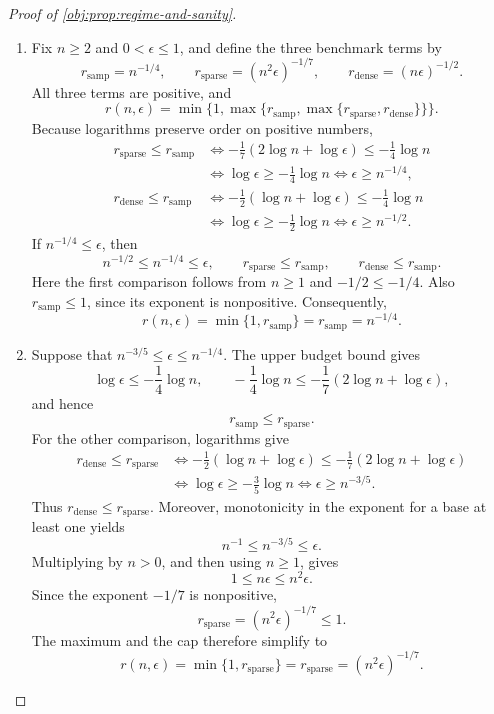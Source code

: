 \documentclass[11pt]{article}
\begin{document}
\begin{proof}[Proof of \cref{obj:prop:regime-and-sanity}]
\begin{enumerate}
\item Fix \(n\ge2\) and \(0<\epsilon\le1\), and define the three benchmark terms by
\[
r_{\mathrm{samp}}=n^{-1/4},
\qquad
r_{\mathrm{sparse}}=(n^2\epsilon)^{-1/7},
\qquad
r_{\mathrm{dense}}=(n\epsilon)^{-1/2}.
\]
All three terms are positive, and
\[
r(n,\epsilon)
=\min\{1,\max\{r_{\mathrm{samp}},
                    \max\{r_{\mathrm{sparse}},r_{\mathrm{dense}}\}\}\}.
\]
Because logarithms preserve order on positive numbers,
\[
\begin{aligned}
r_{\mathrm{sparse}}\le r_{\mathrm{samp}}
&\iff
-\frac17(2\log n+\log\epsilon)\le-\frac14\log n\\
&\iff \log\epsilon\ge-\frac14\log n
\iff \epsilon\ge n^{-1/4},
\\
r_{\mathrm{dense}}\le r_{\mathrm{samp}}
&\iff
-\frac12(\log n+\log\epsilon)\le-\frac14\log n\\
&\iff \log\epsilon\ge-\frac12\log n
\iff \epsilon\ge n^{-1/2}.
\end{aligned}
\]
If \(n^{-1/4}\le\epsilon\), then
\[
n^{-1/2}\le n^{-1/4}\le\epsilon,
\qquad
r_{\mathrm{sparse}}\le r_{\mathrm{samp}},
\qquad
r_{\mathrm{dense}}\le r_{\mathrm{samp}}.
\]
Here the first comparison follows from \(n\ge1\) and
\(-1/2\le-1/4\). Also \(r_{\mathrm{samp}}\le1\), since its exponent is nonpositive. Consequently,
\[
r(n,\epsilon)
=\min\{1,r_{\mathrm{samp}}\}
=r_{\mathrm{samp}}
=n^{-1/4}.
\]

\item Suppose that \(n^{-3/5}\le\epsilon\le n^{-1/4}\).
The upper budget bound gives
\[
\log\epsilon\le-\frac14\log n,
\qquad
-\frac14\log n
\le-\frac17(2\log n+\log\epsilon),
\]
and hence
\[
r_{\mathrm{samp}}\le r_{\mathrm{sparse}}.
\]
For the other comparison, logarithms give
\[
\begin{aligned}
r_{\mathrm{dense}}\le r_{\mathrm{sparse}}
&\iff
-\frac12(\log n+\log\epsilon)
\le-\frac17(2\log n+\log\epsilon)\\
&\iff \log\epsilon\ge-\frac35\log n
\iff \epsilon\ge n^{-3/5}.
\end{aligned}
\]
Thus \(r_{\mathrm{dense}}\le r_{\mathrm{sparse}}\).
Moreover, monotonicity in the exponent for a base at least one yields
\[
n^{-1}\le n^{-3/5}\le\epsilon.
\]
Multiplying by \(n>0\), and then using \(n\ge1\), gives
\[
1\le n\epsilon\le n^2\epsilon.
\]
Since the exponent \(-1/7\) is nonpositive,
\[
r_{\mathrm{sparse}}=(n^2\epsilon)^{-1/7}\le1.
\]
The maximum and the cap therefore simplify to
\[
r(n,\epsilon)
=\min\{1,r_{\mathrm{sparse}}\}
=r_{\mathrm{sparse}}
=(n^2\epsilon)^{-1/7}.
\]


\end{enumerate}
\end{proof}
\end{document}
